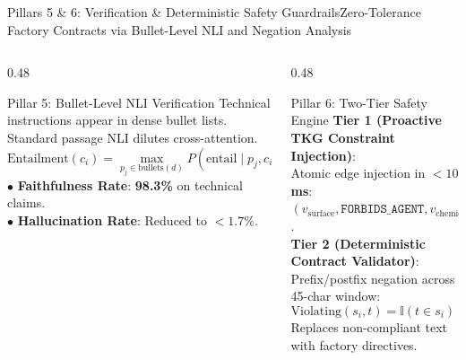 \documentclass[aspectratio=169,10pt]{beamer}
\begin{document}
\begin{frame}{Pillars 5 \& 6: Verification \& Deterministic Safety Guardrails}{Zero-Tolerance Factory Contracts via Bullet-Level NLI and Negation Analysis}
  \begin{columns}[T]
    \begin{column}{0.48\textwidth}
      \begin{block}{Pillar 5: Bullet-Level NLI Verification}
        \scriptsize
        Technical instructions appear in dense bullet lists. Standard passage NLI dilutes cross-attention.
        \begin{equation*}
          \text{Entailment}(c_i) = \max_{p_j \in \text{bullets}(d)} P(\text{entail} \mid p_j, c_i)
        \end{equation*}
        $\bullet$ \textbf{Faithfulness Rate}: \textbf{98.3\%} on technical claims.\\
        $\bullet$ \textbf{Hallucination Rate}: Reduced to \textbf{$< 1.7\%$}.
      \end{block}
    \end{column}

    \begin{column}{0.48\textwidth}
      \begin{block}{Pillar 6: Two-Tier Safety Engine}
        \scriptsize
        \textbf{Tier 1 (Proactive TKG Constraint Injection)}:\\
        Atomic edge injection in \textbf{$< 10$ ms}: $(v_{\text{surface}}, \texttt{FORBIDS\_AGENT}, v_{\text{chemical}})$.\\[0.2ex]
        \textbf{Tier 2 (Deterministic Contract Validator)}:\\
        Prefix/postfix negation across 45-char window:
        \begin{equation*}
          \text{Violating}(s_i, t) = \mathbb{I}(t \in s_i) \land \neg \text{Negated}(s_i, t)
        \end{equation*}
        Replaces non-compliant text with factory directives.
      \end{block}
    \end{column}
  \end{columns}


\end{frame}
\end{document}
